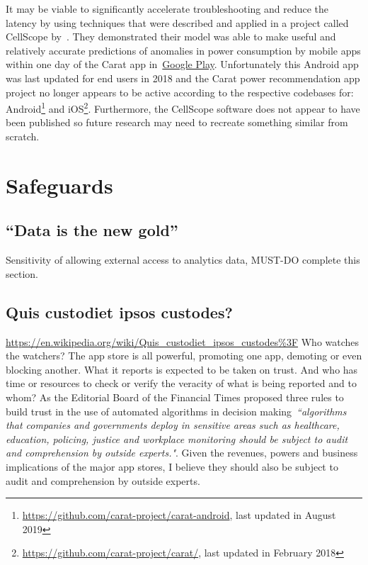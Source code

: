 It may be viable to significantly accelerate troubleshooting and reduce the latency by using techniques that were described and applied in a project called CellScope by~. They demonstrated their model was able to make useful and relatively accurate predictions of anomalies in power consumption by mobile apps within one day of the Carat app in~\href{https://play.google.com/store/apps/details?id=edu.berkeley.cs.amplab.carat.android&hl=en_GB&gl=US}{Google Play}. Unfortunately this Android app was last updated for end users in 2018 and the Carat power recommendation app project no longer appears to be active according to the respective codebases for: Android\footnote{\url{https://github.com/carat-project/carat-android}, last updated in August 2019} and iOS\footnote{\url{https://github.com/carat-project/carat/}, last updated in February 2018}. Furthermore, the CellScope software does not appear to have been published so future research may need to recreate something similar from scratch.



\section{Safeguards}

\subsection{``Data is the new gold''}

Sensitivity of allowing external access to analytics data, MUST-DO complete this section. 


\subsection{Quis custodiet ipsos custodes?}
\url{https://en.wikipedia.org/wiki/Quis_custodiet_ipsos_custodes\%3F}
Who watches the watchers? The app store is all powerful, promoting one app, demoting or even blocking another. What it reports is expected to be taken on trust. And who has time or resources to check or verify the veracity of what is being reported and to whom? As the Editorial Board of the Financial Times proposed three rules to build trust in the use of automated algorithms in decision making~\emph{``algorithms that companies and governments deploy in sensitive areas such as healthcare, education, policing, justice and workplace monitoring should be subject to audit and comprehension by outside experts."}. Given the revenues, powers and business implications of the major app stores, I believe they should also be subject to audit and comprehension by outside experts.

